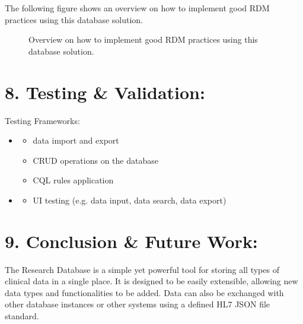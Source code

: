 \documentclass[a4paper,10pt,english]{sphinxmanual}
\begin{document}
\sphinxAtStartPar
The following figure shows an overview on how to implement good RDM practices using this database solution.

\begin{figure}[htbp]
\centering
\capstart

\noindent{}
\caption{Overview on how to implement good RDM practices using this database solution.}\label{\detokenize{TechnicalDetails:id13}}\end{figure}


\chapter{8. Testing \& Validation:}
\label{\detokenize{TechnicalDetails:testing-validation}}
\sphinxAtStartPar
Testing Frameworks:
\begin{itemize}
\item {} \begin{description}
\begin{itemize}
\item {} 
\sphinxAtStartPar
data import and export

\item {} 
\sphinxAtStartPar
CRUD operations on the database

\item {} 
\sphinxAtStartPar
CQL rules application

\end{itemize}

\end{description}

\item {} \begin{description}
\begin{itemize}
\item {} 
\sphinxAtStartPar
UI testing (e.g. data input, data search, data export)

\end{itemize}

\end{description}

\end{itemize}


\chapter{9. Conclusion \& Future Work:}
\label{\detokenize{TechnicalDetails:conclusion-future-work}}
\sphinxAtStartPar
The Research Database is a simple yet powerful tool for storing all types of clinical data in a single place. It is designed to be easily extensible, allowing new data types and functionalities to be added. Data can also be exchanged with other database instances or other systems using a defined HL7 JSON file standard.
\end{document}
